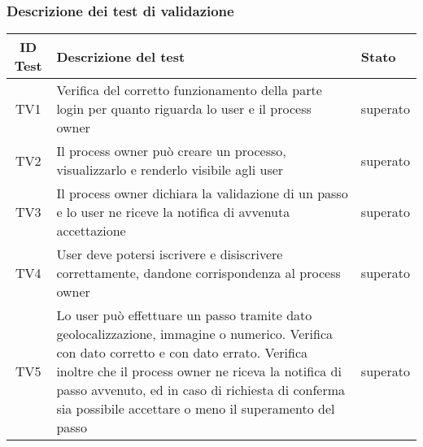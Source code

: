 \subsubsection{Descrizione dei test di validazione}
\begin{small}\centering
\begin{tabular}{|c|p{8.0cm}|p{2.0cm}|}
\hline
\textbf{ID Test} & \textbf{Descrizione del test} & \textbf{Stato}\\
\hline
TV1& Verifica del corretto funzionamento della parte login per quanto riguarda lo user e il process owner & superato\\
\hline
TV2& Il process owner può creare un processo, visualizzarlo e renderlo visibile agli user&superato\\
\hline
TV3& Il process owner dichiara la validazione di un passo e lo user ne riceve la notifica di avvenuta accettazione&superato\\
\hline
TV4& User deve potersi iscrivere e disiscrivere correttamente, dandone corrispondenza al process owner&superato\\
\hline
TV5& Lo user può effettuare un passo tramite dato geolocalizzazione, immagine o numerico. Verifica con dato corretto e con dato errato. Verifica inoltre che il process owner ne riceva la notifica di passo avvenuto, ed in caso di richiesta di conferma sia possibile accettare o meno il superamento del passo&superato\\
\hline
\end{tabular}\\
\end{small}



